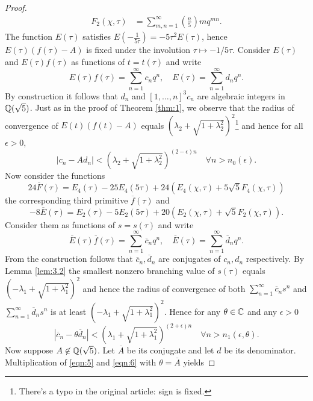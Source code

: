 \begin{proof}
\begin{align*}
        F_2(\chi, \tau) &= \sum_{m, n=1}^{\infty} \left(\frac{n}{5}\right) m q^{mn}.
    \end{align*}
    The function $E(\tau)$ satisfies $E(-\frac{1}{5\tau}) = -5\tau^2 E(\tau)$, hence $E(\tau) (f(\tau) - A)$ is fixed under the involution $\tau \mapsto -1/5\tau$.
    Consider $E(\tau)$ and $E(\tau)f(\tau)$ as functions of $t = t(\tau)$ and write
    $$
        E(\tau)f(\tau) = \sum_{n=1}^{\infty} c_n q^n, \quad E(\tau) = \sum_{n=1}^{\infty} d_n q^n.
    $$
    By construction it follows that $d_n$ and $[1, \dots, n]^3 c_n$ are algebraic integers in $\mathbb{Q}(\sqrt{5})$.
    Just as in the proof of Theorem \ref{thm:1}, we observe that the radius of convergence of $E(t)(f(t) - A)$ equals $(\lambda_2 + \sqrt{1 + \lambda_2^2})^2$\footnote{There's a typo in the original article: sign is fixed.} and hence for all $\epsilon > 0$,
    \begin{equation}
        \label{eqn:5}
        |c_n - A d_n| < (\lambda_2 + \sqrt{1 + \lambda_2^2})^{(2 - \epsilon)n} \quad \forall n > n_0(\epsilon).
    \end{equation}
    Now consider the functions
    $$
        24 \overline{F}(\tau) = E_4(\tau) - 25 E_4(5\tau) + 24(E_4(\chi, \tau) + 5\sqrt{5} F_4(\chi, \tau)) 
    $$
    the corresponding third primitive $\overline{f}(\tau)$ and
    $$
        -8 \overline{E}(\tau) = E_2(\tau) - 5 E_2(5\tau) + 20 (E_2(\chi, \tau) + \sqrt{5} F_2(\chi, \tau)).
    $$
    Consider them as functions of $s = s(\tau)$ and write
    $$
        \overline{E}(\tau) \overline{f}(\tau) = \sum_{n=1}^{\infty} \overline{c}_n q^n, \quad \overline{E}(\tau) = \sum_{n=1}^{\infty} \overline{d}_n q^n.
    $$
    From the construction follows that $\overline{c}_n, \overline{d}_n$ are conjugates of $c_n, d_n$ respectively.
    By Lemma \ref{lem:3.2} the smallest nonzero branching value of $s(\tau)$ equals $(-\lambda_1 + \sqrt{1 + \lambda_1^2})^{2}$ and hence the radius of convergence of both $\sum_{n=1}^{\infty} \overline{c}_{n} s^n$ and $\sum_{n=1}^{\infty} \overline{d}_{n} s^n$ is at least $(-\lambda_1 + \sqrt{1 + \lambda_1^2})^{2}$.
    Hence for any $\theta \in \mathbb{C}$ and any $\epsilon > 0$
    \begin{equation}
        \label{eqn:6}
        |\overline{c}_n - \theta \overline{d}_n| < (\lambda_1 + \sqrt{1 + \lambda_1^2})^{(2 + \epsilon) n} \quad \forall n > n_1(\epsilon, \theta).
    \end{equation}
    Now suppose $A \not\in \mathbb{Q}(\sqrt{5})$.
    Let $\overline{A}$ be its conjugate and let $d$ be its denominator.
    Multiplication of \eqref{eqn:5} and \eqref{eqn:6} with $\theta = \overline{A}$ yields

\end{proof}
